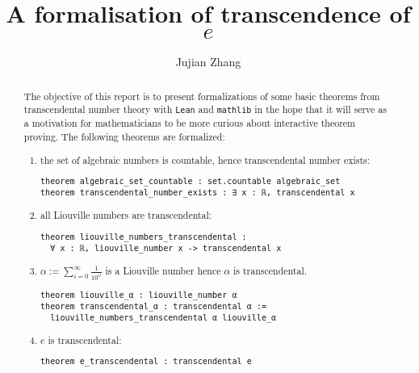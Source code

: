 \documentclass{report}
\title{A formalisation of transcendence of $e$}
\author{Jujian Zhang}
\theoremstyle{definition}
\theoremstyle{plain}
\begin{document}
\maketitle

\begin{abstract}
The objective of this report is to present formalizations of some basic theorems from transcendental number theory with {\tt Lean} and {\tt mathlib} in the hope that it will serve as a motivation for mathematicians to be more curious about interactive theorem proving. The following theorems are formalized:
\begin{enumerate}
  \item the set of algebraic numbers is countable, hence transcendental number exists:

\begin{verbatim}
theorem algebraic_set_countable : set.countable algebraic_set
theorem transcendental_number_exists : ∃ x : ℝ, transcendental x
\end{verbatim}

  \item all Liouville numbers are transcendental:
\begin{verbatim}
theorem liouville_numbers_transcendental : 
  ∀ x : ℝ, liouville_number x -> transcendental x
\end{verbatim}

  \item $\alpha := \sum_{i=0}^\infty\frac1{10^{i!}}$ is a Liouville number hence $\alpha$ is transcendental.

\begin{verbatim}
theorem liouville_α : liouville_number α
theorem transcendental_α : transcendental α := 
  liouville_numbers_transcendental α liouville_α
\end{verbatim}

  \item $e$ is transcendental:
\begin{verbatim}
theorem e_transcendental : transcendental e
\end{verbatim}
\end{enumerate}
\end{abstract}
\end{document}
